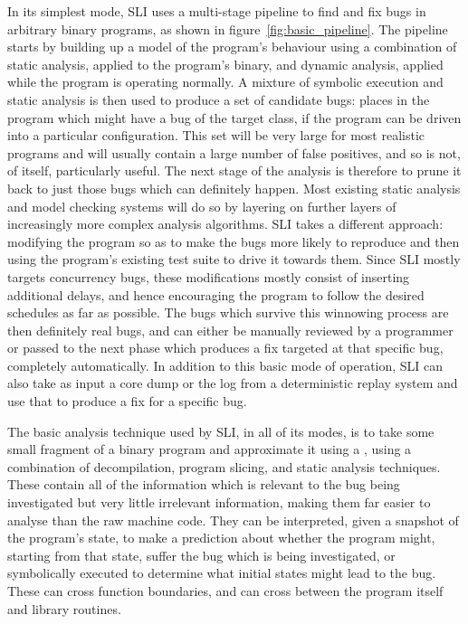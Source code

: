 In its simplest mode, SLI uses a multi-stage pipeline to find and fix bugs in arbitrary binary programs, as shown in figure~\ref{fig:basic_pipeline}.
The pipeline starts by building up a model of the program's behaviour using a combination of static analysis, applied to the program's binary, and dynamic analysis, applied while the program is operating normally.
A mixture of symbolic execution and static analysis is then used to produce a set of candidate bugs: places in the program which might have a bug of the target class, if the program can be driven into a particular configuration.
This set will be very large for most realistic programs and will usually contain a large number of false positives, and so is not, of itself, particularly useful.
The next stage of the analysis is therefore to prune it back to just those bugs which can definitely happen.
Most existing static analysis and model checking systems will do so by layering on further layers of increasingly more complex analysis algorithms.
SLI takes a different approach: modifying the program so as to make the bugs more likely to reproduce and then using the program's existing test suite to drive it towards them.
Since SLI mostly targets concurrency bugs, these modifications mostly consist of inserting additional delays, and hence encouraging the program to follow the desired schedules as far as possible.
The bugs which survive this winnowing process are then definitely real bugs, and can either be manually reviewed by a programmer or passed to the next phase which produces a fix targeted at that specific bug, completely automatically.
In addition to this basic mode of operation, SLI can also take as input a core dump or the log from a deterministic replay system and use that to produce a fix for a specific bug.

The basic analysis technique used by SLI, in all of its modes, is to take some small fragment of a binary program and approximate it using a \StateMachine, using a combination of decompilation, program slicing, and static analysis techniques.
These \StateMachines contain all of the information which is relevant to the bug being investigated but very little irrelevant information, making them far easier to analyse than the raw machine code.
They can be interpreted, given a snapshot of the program's state, to make a prediction about whether the program might, starting from that state, suffer the bug which is being investigated, or symbolically executed to determine what initial states might lead to the bug.
These \StateMachines can cross function boundaries, and can cross between the program itself and library routines.

